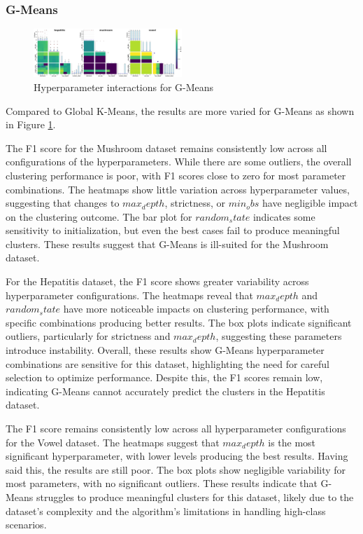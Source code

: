 \subsubsection{G-Means}
\label{subsec:gmeansresults}

\begin{figure}[h!]
    \centering
    \includegraphics[width=0.5\textwidth]{figures/interactions_gmeans.png}
    \caption{Hyperparameter interactions for G-Means}
    \label{fig:interactions_gmeans}
\end{figure}

Compared to Global K-Means, the results are more varied for G-Means as shown in Figure \ref{fig:interactions_gmeans}.

The F1 score for the Mushroom dataset remains consistently low across all configurations of the hyperparameters.
While there are some outliers, the overall clustering performance is poor, with F1 scores close to zero for most parameter combinations.
The heatmaps show little variation across hyperparameter values, suggesting that changes to $max_depth$, strictness, or $min_obs$ have
negligible impact on the clustering outcome. The bar plot for $random_state$ indicates some sensitivity to initialization, but even
the best cases fail to produce meaningful clusters. These results suggest that G-Means is ill-suited for the Mushroom dataset.

For the Hepatitis dataset, the F1 score shows greater variability across hyperparameter configurations. The heatmaps reveal that
$max_depth$ and $random_state$ have more noticeable impacts on clustering performance, with specific combinations producing
better results. The box plots indicate significant outliers, particularly for strictness and $max_depth$, suggesting these parameters
introduce instability. Overall, these results show G-Means hyperparameter combinations are sensitive for this dataset,
highlighting the need for careful selection to optimize performance. Despite this, the F1 scores remain low, indicating G-Means
cannot accurately predict the clusters in the Hepatitis dataset.

The F1 score remains consistently low across all hyperparameter configurations for the Vowel dataset.
The heatmaps suggest that $max_depth$ is the most significant hyperparameter, with lower levels producing the best results.
Having said this, the results are still poor. The box plots show negligible variability for most parameters, with no significant outliers.
These results indicate that G-Means struggles to produce meaningful clusters for this dataset,
likely due to the dataset's complexity and the algorithm's limitations in handling high-class scenarios.